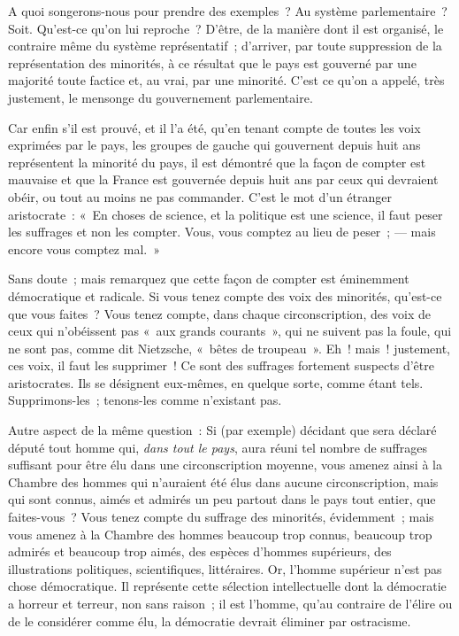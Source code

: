 \documentclass[french,twoside]{book} %
\begin{document}
A quoi songerons-nous pour prendre des exemples ? Au système parlementaire ? Soit. Qu’est-ce qu’on lui reproche ? D’être, de la manière dont il est organisé, le contraire même du système représentatif ; d’arriver, par toute suppression de la représentation des minorités, à ce résultat que le pays est gouverné par une majorité toute factice et, au vrai, par une minorité. C’est ce qu’on a appelé, très justement, le mensonge du gouvernement parlementaire.\par
Car enfin s’il est prouvé, et il l’a été, qu’en tenant compte de toutes les voix exprimées par le pays, les groupes de gauche qui gouvernent depuis huit ans représentent la minorité du pays, il est démontré que la façon de compter est mauvaise et que la France est gouvernée depuis huit ans par ceux qui devraient obéir, ou tout au moins ne pas  commander. C’est le mot d’un étranger aristocrate : « En choses de science, et la politique est une science, il faut peser les suffrages et non les compter. Vous, vous comptez au lieu de peser ; — mais encore vous comptez mal. »\par
Sans doute ; mais remarquez que cette façon de compter est éminemment démocratique et radicale. Si vous tenez compte des voix des minorités, qu’est-ce que vous faites ? Vous tenez compte, dans chaque circonscription, des voix de ceux qui n’obéissent pas « aux grands courants », qui ne suivent pas la foule, qui ne sont pas, comme dit Nietzsche, « bêtes de troupeau ». Eh ! mais ! justement, ces voix, il faut les supprimer ! Ce sont des suffrages fortement suspects d’être aristocrates. Ils se désignent eux-mêmes, en quelque sorte, comme étant tels. Supprimons-les ; tenons-les comme n’existant pas.\par
Autre aspect de la même question : Si (par exemple) décidant que sera déclaré député tout homme qui, {\itshape dans tout le pays}, aura réuni tel nombre de suffrages suffisant pour être élu dans une circonscription moyenne, vous amenez ainsi à la Chambre des hommes qui n’auraient été élus dans aucune circonscription, mais qui sont connus, aimés et admirés un peu partout dans le pays tout entier, que faites-vous ? Vous tenez compte du suffrage des  minorités, évidemment ; mais vous amenez à la Chambre des hommes beaucoup trop connus, beaucoup trop admirés et beaucoup trop aimés, des espèces d’hommes supérieurs, des illustrations politiques, scientifiques, littéraires. Or, l’homme supérieur n’est pas chose démocratique. Il représente cette sélection intellectuelle dont la démocratie a horreur et terreur, non sans raison ; il est l’homme, qu’au contraire de l’élire ou de le considérer comme élu, la démocratie devrait éliminer par ostracisme.\par
\end{document}
